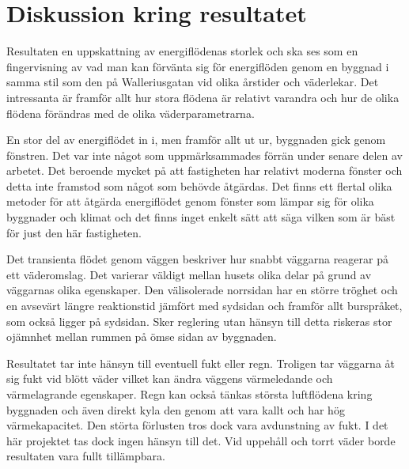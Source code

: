 \section{Diskussion kring resultatet}

Resultaten en uppskattning av energiflödenas storlek och ska ses som en fingervisning av vad man kan förvänta sig för energiflöden genom en byggnad i samma stil som den på Walleriusgatan vid olika årstider och väderlekar. Det intressanta är framför allt hur stora flödena är relativt varandra och hur de olika flödena förändras med de olika väderparametrarna.

En stor del av energiflödet in i, men framför allt ut ur, byggnaden gick genom fönstren. Det var inte något som uppmärksammades förrän under senare delen av arbetet. Det beroende mycket på att fastigheten har relativt moderna fönster och detta inte framstod som något som behövde åtgärdas. Det finns ett flertal olika metoder för att åtgärda energiflödet genom fönster som lämpar sig för olika byggnader och klimat och det finns inget enkelt sätt att säga vilken som är bäst för just den här fastigheten.

Det transienta flödet genom väggen beskriver hur snabbt väggarna reagerar på ett väderomslag. Det varierar väldigt mellan husets olika delar på grund av väggarnas olika egenskaper. Den välisolerade norrsidan har en större tröghet och en avsevärt längre reaktionstid jämfört med sydsidan och framför allt burspråket, som också ligger på sydsidan. Sker reglering utan hänsyn till detta riskeras stor ojämnhet mellan rummen på ömse sidan av byggnaden.

Resultatet tar inte hänsyn till eventuell fukt eller regn. Troligen tar väggarna åt sig fukt vid blött väder vilket kan ändra väggens värmeledande och värmelagrande egenskaper. Regn kan också tänkas största luftflödena kring byggnaden och även direkt kyla den genom att vara kallt och har hög värmekapacitet. Den störta förlusten tros dock vara avdunstning av fukt. I det här projektet tas dock ingen hänsyn till det. Vid uppehåll och torrt väder borde resultaten vara fullt tillämpbara.

